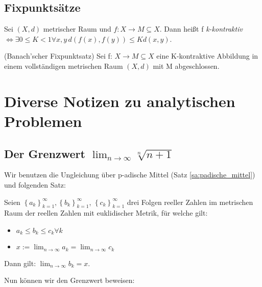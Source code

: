 \documentclass[10pt]{scrbook}
\begin{document}
\subsection{Fixpunktsätze}

\begin{Def}
Sei $(X, d)$ metrischer Raum und $f: X\rightarrow M\subseteq X$. Dann heißt f \emph{k-kontraktiv} $\Leftrightarrow \exists 0\leq K < 1 \forall x, y\,d(f(x), f(y))\leq K d(x, y)$.
\end{Def}

\begin{Sa} (Banach'scher Fixpunktsatz) \label{sa:banachscher_fixpunktsatz}
Sei f: $X\rightarrow M\subseteq X$ eine K-kontraktive Abbildung in einem vollständigen metrischen Raum $(X, d)$ mit M abgeschlossen.
\end{Sa}

\section{Diverse Notizen zu analytischen Problemen}

\subsection{Der Grenzwert $\lim_{n\rightarrow\infty} \sqrt[n]{n+1}$}

Wir benutzen die Ungleichung über p-adische Mittel (Satz \ref{sa:padische_mittel}) und folgenden Satz:

\begin{Sa}
\label{sa:grenzwerte_majorante_und_minorante}
Seien $\left\{a_k\right\}_{k=1}^\infty, \left\{b_k\right\}_{k=1}^\infty$, $\left\{c_k\right\}_{k=1}^\infty$ drei Folgen reeller Zahlen im metrischen Raum der reellen Zahlen mit euklidischer Metrik, für welche gilt:
\begin{itemize}
\item $a_k \leq b_k \leq c_k \forall k$
\item $x := \lim_{n\rightarrow \infty} a_k = \lim_{n\rightarrow \infty} c_k$
\end{itemize}
Dann gilt: $\lim_{n\rightarrow \infty} b_k = x$.
\end{Sa}

Nun können wir den Grenzwert beweisen:
\end{document}
